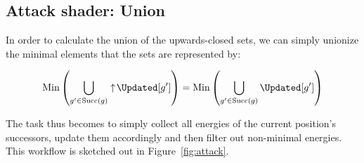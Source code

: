 \subsection{Attack shader: Union}\label{subsec:attack_shader}

In order to calculate the union of the upwards-closed sets,
we can simply unionize the minimal elements that the sets are represented by:

\[\mathrm{Min} \left( \bigcup_{g' \in \mathrm{Succ}(g)} \upclosed \Updated[g'] \right) =
  \mathrm{Min} \left( \bigcup_{g' \in \mathrm{Succ}(g)}           \Updated[g'] \right)\]

The task thus becomes to simply
collect all energies of the current position's successors,
update them accordingly
and then filter out non-minimal energies.
This workflow is sketched out in Figure~\ref{fig:attack}.

